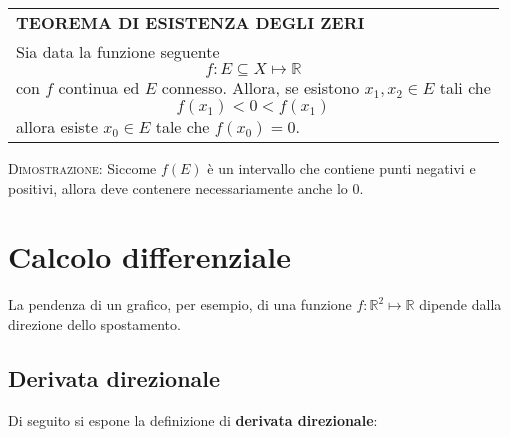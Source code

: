 \documentclass[a4paper]{extarticle}
\renewcommand\arraystretch{}
\begin{document}
\vspace{1em}
\setlength{\tabcolsep}{14pt}
\renewcommand{\arraystretch}{2}
\noindent
\begin{tabularx}{\textwidth}{@{}|P|@{}}
    \hline
    {\textbf{TEOREMA DI ESISTENZA DEGLI ZERI}}\\
    \parbox{\linewidth}{Sia data la funzione seguente
    \[f : E \subseteq X \longmapsto \mathbb{R}\]
    con $f$ continua ed $E$ connesso. Allora, se esistono $x_1,x_2 \in E$ tali che
    \[f(x_1) < 0 < f(x_1)\]
    allora esiste $x_0 \in E$ tale che $f(x_0)=0$.
    \vspace{3mm}}\\
    \hline
\end{tabularx}

\vspace{2em}
\noindent
\normalfont \normalsize
\textsc{Dimostrazione}: Siccome $f(E)$ è un intervallo che contiene punti negativi e positivi, allora deve contenere necessariamente anche lo $0$.

\newpage
\noindent
\section{Calcolo differenziale}
La pendenza di un grafico, per esempio, di una funzione $f : \mathbb{R}^2 \longmapsto \mathbb{R}$ dipende dalla direzione dello spostamento.

\vspace{1em}
\noindent
\subsection{Derivata direzionale}
Di seguito si espone la definizione di \textbf{derivata direzionale}:
\end{document}
